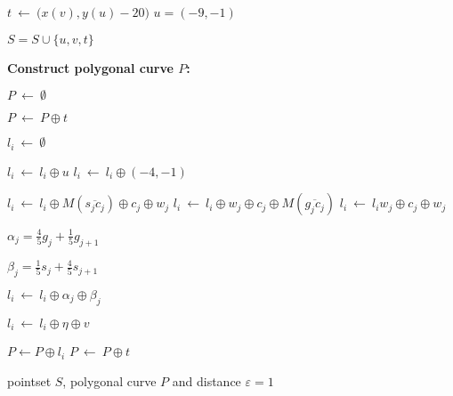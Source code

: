 \documentclass[a4paper,UKenglish]{lipics}
\newcommand{\eps}{\varepsilon}
\newcommand{\eq}{{\ \leftarrow\ }}
\newcommand{\CS}{{\mathscr S}}
\newcommand{\CQ}{{\mathscr Q}}
\newcommand{\cfev}{{l}} \newcommand{\sq}{{\CS\CQ}}
\newcommand{\Seg}[1]{{\overline{#1}}}
\newcommand{\ap}{\oplus}
\newcommand{\pset}{S}
\begin{document}
\begin{algorithm}
\begin{algorithmic}[1]
	\STATE $t \eq \big(x(v),y(u) -20\big)$
	\STATE $u = (-9,-1)$

    \STATE $\pset = \pset \cup \{u, v, t\}$ \label{l:makeSEnd}



 	

\vspace{0.15in}

	\hspace{-0.25in} {\bf Construct polygonal curve $P$:}  

	
	\STATE $P \eq \emptyset$ \label{l:makeP}

		

	\STATE $P \eq P \ap t$  


	   \label{l:mainstart}

		\STATE  $\cfev_i \eq \emptyset$ \label{l:startofL}

		\STATE  $\cfev_{i} \eq \cfev_{i} \ap u$ \STATE $\cfev_{i} \eq \cfev_{i} \ap (-4,-1) $  \label{l:Adduh1toell}
		 \label{l:looptoMakeL}	

	

			 \label{l:makeclausestart}	
\STATE $\cfev_{i} \eq \cfev_{i} \ap M(\Seg{s_jc_j}) \ap c_j \ap w_j  $
\STATE $\cfev_{i} \eq \cfev_{i} \ap w_j \ap c_j \ap M(\Seg{g_jc_j} ) $
			\ELSE		
			\STATE $\cfev_i \eq \cfev_i w_j \ap c_j \ap w_j$
			\ENDIF \label{l:makeclauseend}



			\STATE $\alpha_j =  \frac{4}{5} g_j + \frac{1}{5} g_{j+1}$ \label{l:alpha}

			\STATE $\beta_j = \frac{1}{5} s_j + \frac{4}{5} s_{j+1} $ \label{l:beta}
			
			\STATE $\cfev_i \eq \cfev_i \ap \alpha_j \ap \beta_j$


			\ENDIF

		
		\ENDFOR
	
		\STATE $\cfev_i \eq \cfev_i \ap \eta \ap v$ \label{l:subcurve}


		\STATE  $P \leftarrow P \ap \cfev_i$ 
		\STATE  $P \eq P \ap t$
		   
		
		

	\ENDFOR


	\vspace{0.05in}
\RETURN  pointset $\pset$, polygonal curve $P$ and distance $\eps = 1$
	

\end{algorithmic}
\end{algorithm}
\end{document}
